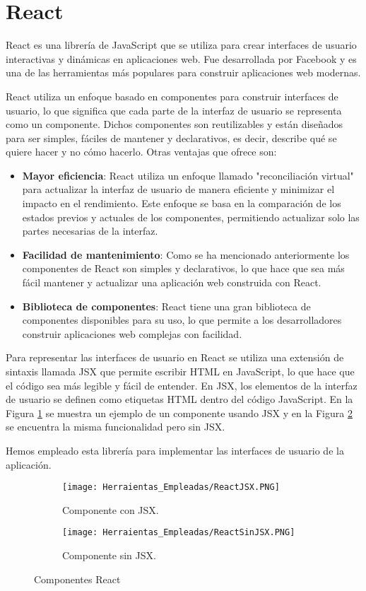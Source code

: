 \section{React}\label{sec:React}
React es una librería de JavaScript que se utiliza para crear interfaces de usuario interactivas y dinámicas en aplicaciones web. Fue desarrollada por Facebook y es una de las herramientas más populares para construir aplicaciones web modernas.

React utiliza un enfoque basado en componentes para construir interfaces de usuario, lo que significa que cada parte de la interfaz de usuario se representa como un componente. Dichos componentes son reutilizables y están diseñados para ser simples, fáciles de mantener y declarativos, es decir, describe qué se quiere hacer y no cómo hacerlo. Otras ventajas que ofrece son:

\begin{itemize}
    \item \textbf{Mayor eficiencia}: React utiliza un enfoque llamado "reconciliación virtual" para actualizar la interfaz de usuario de manera eficiente y minimizar el impacto en el rendimiento. Este enfoque se basa en la comparación de los estados previos y actuales de los componentes, permitiendo actualizar solo las partes necesarias de la interfaz.
    \item \textbf{Facilidad de mantenimiento}: Como se ha mencionado anteriormente los componentes de React son simples y declarativos, lo que hace que sea más fácil mantener y actualizar una aplicación web construida con React.
   \item \textbf{Biblioteca de componentes}: React tiene una gran biblioteca de componentes disponibles para su uso, lo que permite a los desarrolladores construir aplicaciones web complejas con facilidad.
\end{itemize}

Para representar las interfaces de usuario en React se utiliza una extensión de sintaxis llamada JSX que permite escribir HTML en JavaScript, lo que hace que el código sea más legible y fácil de entender. En JSX, los elementos de la interfaz de usuario se definen como etiquetas HTML dentro del código JavaScript. En la Figura \ref{JSX} se muestra un ejemplo de un componente usando JSX y en la Figura \ref{SJSX} se encuentra la misma funcionalidad pero sin JSX.

Hemos empleado esta librería para implementar las interfaces de usuario de la aplicación.
  \begin{figure}[ht!]
   
    \begin{subfigure}{\textwidth}
      \centering
      \texttt{[image: Herraientas\_Empleadas/ReactJSX.PNG]}
      \caption{Componente con JSX.}
      \label{JSX}
    \end{subfigure}
  
    \begin{subfigure}{\textwidth}
      \centering
      \texttt{[image: Herraientas\_Empleadas/ReactSinJSX.PNG]}
      \caption{Componente sin JSX.}
      \label{SJSX}
    \end{subfigure}
    \caption{Componentes React}
    \label{fig:react}
  \end{figure}